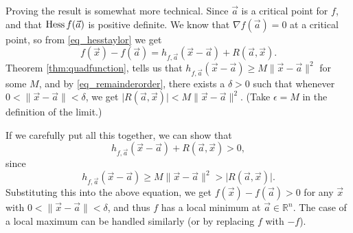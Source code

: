Proving the result is somewhat more technical. Since $\vec{a}$ is a critical point for $f$, and that $\operatorname{Hess} f(\vec{a})$ is positive definite. We know that $\nabla f(\vec{a})=0$ at a critical point, so from \eqref{eq_hesstaylor} we get
\[
f(\vec{x})-f(\vec{a}) = h_{f,\vec{a}}(\vec{x}-\vec{a})+R(\vec{a},\vec{x}).
\]
Theorem \ref{thm:quadfunction}, tells us that $h_{f,\vec{a}}(\vec{x}-\vec{a})\geq M\lVert\vec{x}-\vec{a}\rVert^2$ for some $M$, and by \eqref{eq_remainderorder}, there exists a $\delta>0$ such that whenever $0<\lVert \vec{x}-\vec{a}\rVert<\delta$, we get $\lvert R(\vec{a},\vec{x})\rvert<M\lVert \vec{x}-\vec{a}\rVert^2$. (Take $\epsilon=M$ in the definition of the limit.) 

If we carefully put all this together, we can show that
\[
h_{f,\vec{a}}(\vec{x}-\vec{a})+R(\vec{a},\vec{x})>0,
\]
since 
\[
h_{f,\vec{a}}(\vec{x}-\vec{a})\geq M\lVert \vec{x}-\vec{a}\rVert^2> \lvert R(\vec{a},\vec{x})\rvert.
\]
Substituting this into the above equation, we get $f(\vec{x})-f(\vec{a})>0$ for any $\vec{x}$ with $0<\lVert\vec{x}-\vec{a}\rVert<\delta$, and thus $f$ has a local minimum at $\vec{a}\in\mathbb{R}^n$. The case of a local maximum can be handled similarly (or by replacing $f$ with $-f$).\\






